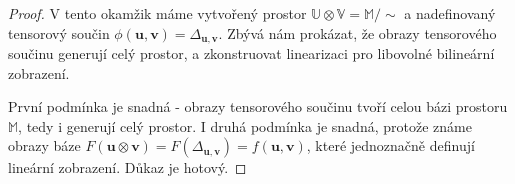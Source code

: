 \documentclass[a5paper,12pt]{amsbook}
\theoremstyle{definition}
\newcommand{\myvec}[1]{\bm{#1}}
\newcommand{\myspace}[1]{\mathbb{#1}}
\begin{document}
\begin{proof}
V tento okamžik máme vytvořený prostor $\myspace{U}\otimes\myspace{V} = \myspace{M}/{\sim}$
a nadefinovaný tensorový součin $\phi(\myvec{u}, \myvec{v}) = \Delta_{\myvec{u}, \myvec{v}}$.
Zbývá nám prokázat, že obrazy tensorového součinu generují celý prostor, a zkonstruovat
linearizaci pro libovolné bilineární zobrazení.

První podmínka je snadná - obrazy tensorového součinu tvoří celou bázi prostoru $\myspace{M}$,
tedy i generují celý prostor. I druhá podmínka je snadná, protože známe obrazy báze
$F(\myvec{u}\otimes\myvec{v}) = F(\Delta_{\myvec{u}, \myvec{v}}) = f(\myvec{u}, \myvec{v})$,
které jednoznačně definují lineární zobrazení. Důkaz je hotový.
\end{proof}
\end{document}
